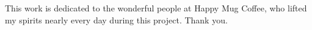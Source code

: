 This work is dedicated to the wonderful people at Happy Mug Coffee, who lifted my spirits nearly every day during this project. Thank you.
